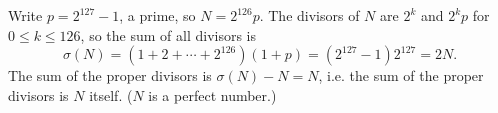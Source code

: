 Write $p=2^{127}-1$, a prime, so $N=2^{126}p$. The divisors of $N$ are $2^k$ and $2^kp$ for $0\le k\le126$, so the sum of all divisors is
\[\sigma(N)=\left(1+2+\cdots+2^{126}\right)(1+p)=\left(2^{127}-1\right)2^{127}=2N.\]
The sum of the proper divisors is $\sigma(N)-N=N$, i.e. the sum of the proper divisors is $\boxed{N}$ itself. ($N$ is a perfect number.)
